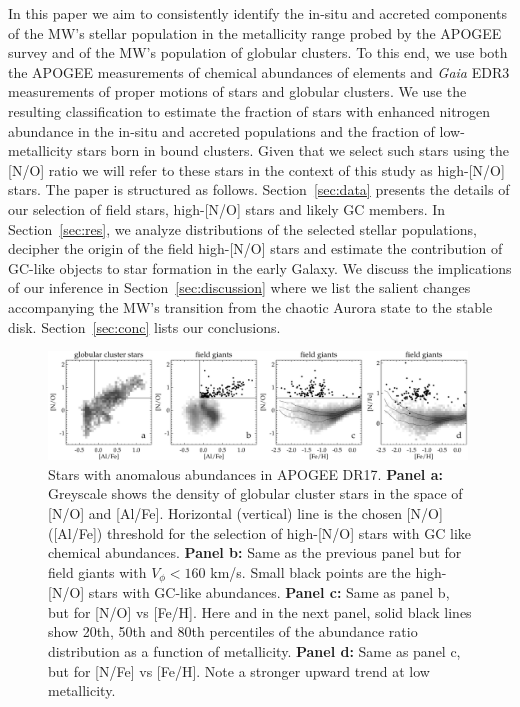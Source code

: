 \documentclass[a4paper,useAMS,usenatbib]{mnras}
\begin{document}
In this paper we aim to consistently identify the in-situ and accreted components of the MW's stellar population in the metallicity range probed by the APOGEE survey and of the MW's population of globular clusters. To this end, we use both the APOGEE measurements of chemical abundances of elements and {\it Gaia} EDR3 measurements of proper motions of stars and globular clusters. We use the resulting classification to estimate the fraction of stars with enhanced nitrogen abundance in the in-situ and accreted populations and the fraction of low-metallicity stars born in bound clusters. Given that we select such stars using the [N/O] ratio we will refer to these stars in the context of this study as high-[N/O] stars. The paper is structured as follows. Section~\ref{sec:data} presents the details of our selection of field stars, high-[N/O] stars and likely GC members. In Section~\ref{sec:res}, we analyze distributions of the selected stellar populations, decipher the origin of the field high-[N/O] stars and estimate the contribution of GC-like objects to star formation in the early Galaxy. We discuss the implications of our inference in Section~\ref{sec:discussion} where we list the salient changes accompanying the MW's transition from the chaotic Aurora state to the stable disk. Section~\ref{sec:conc} lists our conclusions.

%
\begin{figure}
  \centering
  \includegraphics[width=0.99\textwidth]{img/fig1.pdf}
  \caption[]{Stars with anomalous abundances in APOGEE DR17. {\bf Panel a:} Greyscale shows the density of globular cluster stars in the space of [N/O] and [Al/Fe]. Horizontal (vertical) line is the chosen [N/O] ([Al/Fe]) threshold for the selection of high-[N/O] stars with GC like chemical abundances. {\bf Panel b:} Same as the previous panel but for field giants with $V_\phi<160$ km/s. Small black points are the high-[N/O] stars with GC-like abundances.  {\bf Panel c:} Same as panel b, but for [N/O] vs [Fe/H]. Here and in the next panel, solid black lines show 20th, 50th and 80th percentiles of the abundance ratio distribution as a function of metallicity. {\bf Panel d:} Same as panel c, but for [N/Fe] vs [Fe/H]. Note a stronger upward trend at low metallicity. }
   \label{fig:select}
\end{figure}
%
\end{document}
